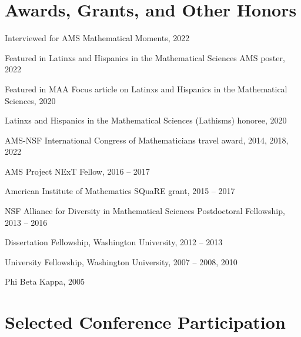 \documentclass[10pt,letterpaper]{article}
\renewenvironment{itemize}{
  \begin{list}{}{
    \setlength{\leftmargin}{1.5em}
    \setlength{\itemsep}{0.25em}
    \setlength{\parskip}{0pt}
    \setlength{\parsep}{0.25em}
  }
}{
  \end{list}
}
\providecommand{\tightlist}{%
  \setlength{\itemsep}{0pt}\setlength{\parskip}{0pt}}
\let\tightlist\relax
\begin{document}
\hypertarget{awards-grants-and-other-honors}{%
\section*{Awards, Grants, and Other
Honors}\label{awards-grants-and-other-honors}}

\begin{itemize}
\tightlist
\item
  Interviewed for AMS Mathematical Moments, 2022
\item
  Featured in Latinxs and Hispanics in the Mathematical Sciences AMS
  poster, 2022
\item
  Featured in MAA Focus article on Latinxs and Hispanics in the
  Mathematical Sciences, 2020
\item
  Latinxs and Hispanics in the Mathematical Sciences (Lathisms) honoree,
  2020
\item
  AMS-NSF International Congress of Mathematicians travel award, 2014,
  2018, 2022
\item
  AMS Project NExT Fellow, 2016 -- 2017
\item
  American Institute of Mathematics SQuaRE grant, 2015 -- 2017
\item
  NSF Alliance for Diversity in Mathematical Sciences Postdoctoral
  Fellowship, 2013 -- 2016
\item
  Dissertation Fellowship, Washington University, 2012 -- 2013
\item
  University Fellowship, Washington University, 2007 -- 2008, 2010
\item
  Phi Beta Kappa, 2005
\end{itemize}

\hypertarget{selected-conference-participation}{%
\section*{Selected Conference
Participation}\label{selected-conference-participation}}
\end{document}
